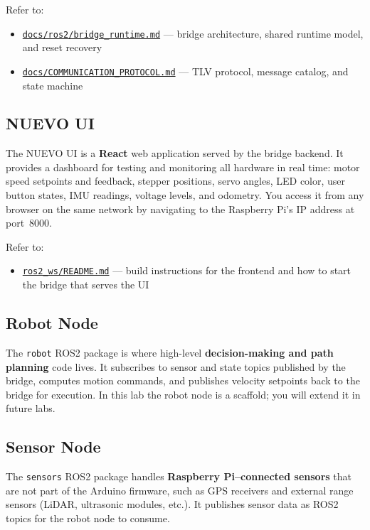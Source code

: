 \documentclass{ol-softwaremanual}
\newcommand{\doclink}[2]{\href{#1}{#2}}
\begin{document}
Refer to:
\begin{itemize}
  \item \doclink{https://github.com/pochihh/Project-NUEVO/blob/main/docs/ros2/bridge_runtime.md}{\texttt{docs/ros2/bridge\_runtime.md}} --- bridge architecture, shared runtime model, and reset recovery
  \item \doclink{https://github.com/pochihh/Project-NUEVO/blob/main/docs/COMMUNICATION_PROTOCOL.md}{\texttt{docs/COMMUNICATION\_PROTOCOL.md}} --- TLV protocol, message catalog, and state machine
\end{itemize}

\subsection*{NUEVO UI}
The NUEVO UI is a \textbf{React} web application served by the bridge backend.
It provides a dashboard for testing and monitoring all hardware in real time:
motor speed setpoints and feedback, stepper positions, servo angles, LED color,
user button states, IMU readings, voltage levels, and odometry.
You access it from any browser on the same network by navigating to the
Raspberry Pi's IP address at port~8000.

Refer to:
\begin{itemize}
  \item \doclink{https://github.com/pochihh/Project-NUEVO/blob/main/ros2_ws/README.md}{\texttt{ros2\_ws/README.md}} --- build instructions for the frontend and how to start the bridge that serves the UI
\end{itemize}

\subsection*{Robot Node}
The \texttt{robot} ROS2 package is where high-level \textbf{decision-making and path planning}
code lives.
It subscribes to sensor and state topics published by the bridge, computes motion commands,
and publishes velocity setpoints back to the bridge for execution.
In this lab the robot node is a scaffold; you will extend it in future labs.

\subsection*{Sensor Node}
The \texttt{sensors} ROS2 package handles \textbf{Raspberry Pi--connected sensors}
that are not part of the Arduino firmware, such as GPS receivers and external range sensors
(LiDAR, ultrasonic modules, etc.).
It publishes sensor data as ROS2 topics for the robot node to consume.
\end{document}
